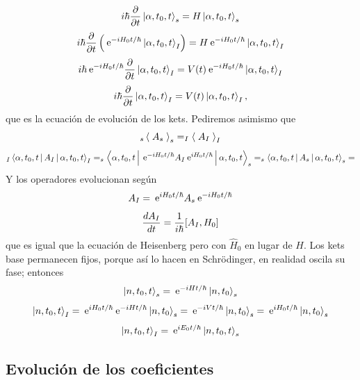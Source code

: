 \documentclass[10pt,oneside]{CBFT_book}
\begin{document}
\[
	i\hbar \frac{\partial^{\hspace{-0.05em}} {}}{\partial {t}^{\hspace{-0.05em}}}\Ket{\alpha,t_0,t}_s = H \Ket{\alpha,t_0,t}_s
\]
\[
	i\hbar \frac{\partial^{\hspace{-0.05em}} {}}{\partial {t}^{\hspace{-0.05em}}}\left( \:\mathrm{e}^{-iH_0t/\hbar}\Ket{\alpha,t_0,t}_I \right) = 
	H \:\mathrm{e}^{-iH_0t/\hbar} \Ket{\alpha,t_0,t}_I
\]
\[
	i\hbar \:\mathrm{e}^{-iH_0t/\hbar}\frac{\partial^{\hspace{-0.05em}} {}}{\partial {t}^{\hspace{-0.05em}}} \Ket{\alpha,t_0,t}_I = 
	V(t) \:\mathrm{e}^{-iH_0t/\hbar} \Ket{\alpha,t_0,t}_I
\]
\[
	i\hbar \frac{\partial^{\hspace{-0.05em}} {}}{\partial {t}^{\hspace{-0.05em}}} \Ket{\alpha,t_0,t}_I = V(t) \Ket{\alpha,t_0,t}_I,
\]
que es la ecuación de evolución de los kets.
Pediremos asimismo que 
\[
	_s\Braket{\; A_s \;}_s = _I\Braket{\; A_I \;}_I
\]
\[
	_I\Braket{\alpha,t_0,t|A_I|\alpha,t_0,t}_I =
	_s\Braket{\alpha,t_0,t|\:\mathrm{e}^{-iH_0t/\hbar}A_I\:\mathrm{e}^{iH_0t/\hbar}|\alpha,t_0,t}_s=
	_s\Braket{\alpha,t_0,t|A_s|\alpha,t_0,t}_s =
\]
Y los operadores evolucionan según 
\[
	A_I = \:\mathrm{e}^{iH_0t/\hbar}A_s\:\mathrm{e}^{-iH_0t/\hbar}
\]
\[
	\frac{d^{\hspace{-0.05em}} {A_I}}{d {t}^{\hspace{-0.05em}}} = \frac{1}{i\hbar}[A_I, H_0]
\]
que es igual que la ecuación de Heisenberg pero con $\hat{H}_0$ en lugar de $H$.
Los kets base permanecen fijos, porque así lo hacen en Schrödinger, en realidad oscila su fase; entonces 
\[
	\Ket{n,t_0,t}_s = \:\mathrm{e}^{-iHt/\hbar} \ket{n,t_0}_s
\]
\[
	\Ket{n,t_0,t}_I = \:\mathrm{e}^{iH_0t/\hbar} \:\mathrm{e}^{-iHt/\hbar} \ket{n,t_0}_s =
	\:\mathrm{e}^{-iVt/\hbar} \ket{n,t_0}_s = \:\mathrm{e}^{iH_0t/\hbar} \ket{n,t_0}_s
\]
\[
	\Ket{n,t_0,t}_I = \:\mathrm{e}^{iE_0t/\hbar} \ket{n,t_0,t}_s
\]

\subsection{Evolución de los coeficientes}
\end{document}
